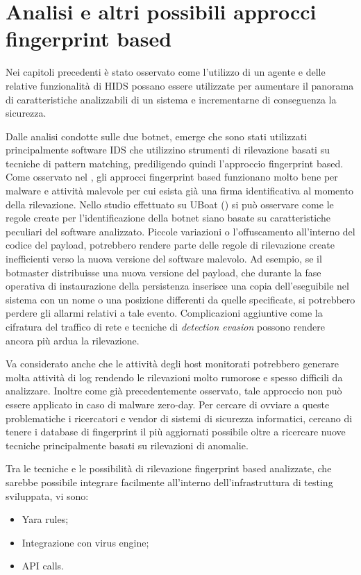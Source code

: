 \chapter{Analisi e altri possibili approcci fingerprint based}

Nei capitoli precedenti è stato osservato  come l'utilizzo di un agente  e delle relative funzionalità di HIDS possano essere utilizzate per  aumentare il panorama di caratteristiche analizzabili di un sistema e incrementarne di conseguenza la sicurezza.

Dalle analisi condotte sulle due botnet, emerge che sono stati utilizzati principalmente software IDS che utilizzino strumenti di rilevazione basati su tecniche di pattern matching, prediligendo quindi l'approccio fingerprint based.
Come osservato nel , gli approcci fingerprint based funzionano molto bene per malware e attività malevole per cui esista già una firma identificativa al momento della rilevazione. Nello studio  effettuato su UBoat () si può osservare come le regole create per l'identificazione della botnet siano basate su caratteristiche peculiari del software analizzato. Piccole variazioni o l'offuscamento all'interno del codice del  payload, potrebbero rendere parte delle regole di rilevazione create inefficienti verso la nuova versione del software malevolo. Ad esempio, se il botmaster distribuisse una nuova versione del payload, che durante la fase operativa di instaurazione della persistenza inserisce una copia dell'eseguibile nel sistema con un nome o una posizione differenti da quelle specificate, si potrebbero perdere gli allarmi relativi a tale evento.
Complicazioni aggiuntive come la cifratura del traffico di rete e tecniche di \textit{detection evasion} possono rendere ancora più ardua la rilevazione.

Va considerato anche che le attività degli host monitorati potrebbero generare molta attività di log rendendo le rilevazioni molto rumorose e spesso difficili da analizzare.
Inoltre come già precedentemente osservato, tale approccio non può essere applicato in caso di malware zero-day. Per cercare di ovviare a queste problematiche i ricercatori e vendor di sistemi di sicurezza informatici, cercano di tenere i database di fingerprint  il più aggiornati possibile oltre a ricercare nuove tecniche principalmente basati su rilevazioni di anomalie.

Tra le tecniche e le possibilità di rilevazione  fingerprint based analizzate, che sarebbe possibile integrare facilmente all'interno dell'infrastruttura di testing sviluppata, vi sono:
\begin{itemize}
    \item Yara rules;
    \item Integrazione con virus engine;
    \item API calls.
\end{itemize}

